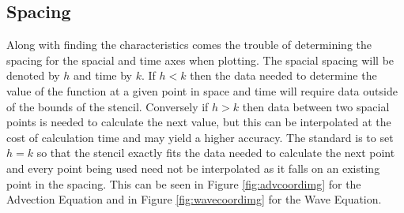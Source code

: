\subsection{Spacing}
Along with finding the characteristics comes the trouble of determining the spacing for the spacial and time axes when plotting. The spacial spacing will be denoted by $h$ and time by $k$. If $h<k$ then the data needed to determine the value of the function at a given point in space and time will require data outside of the bounds of the stencil. Conversely if $h>k$ then data between two spacial points is needed to calculate the next value, but this can be interpolated at the cost of calculation time and may yield a higher accuracy. The standard is to set $h=k$ so that the stencil exactly fits the data needed to calculate the next point and every point being used need not be interpolated as it falls on an existing point in the spacing. This can be seen in Figure \ref{fig:advcoordimg} for the Advection Equation and in Figure \ref{fig:wavecoordimg} for the Wave Equation.
